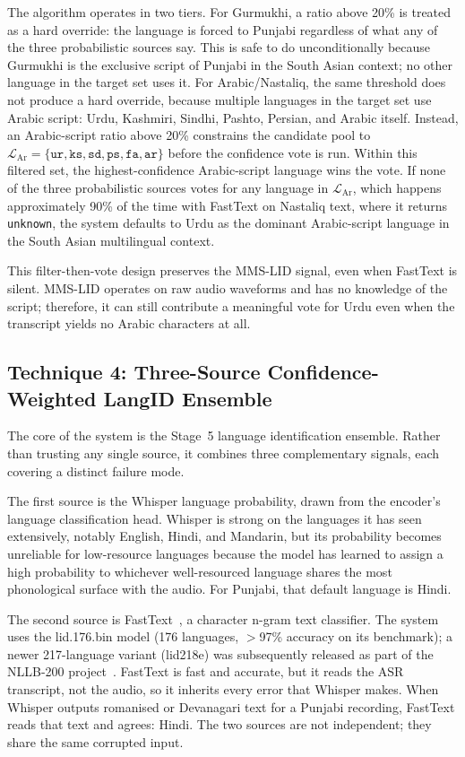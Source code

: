 \documentclass[conference]{IEEEtran}
\begin{document}
The algorithm operates in two tiers. For Gurmukhi, a ratio above 20\% is treated as a hard override: the language is forced to Punjabi regardless of what any of the three probabilistic sources say. This is safe to do unconditionally because Gurmukhi is the exclusive script of Punjabi in the South Asian context; no other language in the target set uses it. For Arabic/Nastaliq, the same threshold does not produce a hard override, because multiple languages in the target set use Arabic script: Urdu, Kashmiri, Sindhi, Pashto, Persian, and Arabic itself. Instead, an Arabic-script ratio above 20\% constrains the candidate pool to $\mathcal{L}_{\text{Ar}} = \{\texttt{ur}, \texttt{ks}, \texttt{sd}, \texttt{ps}, \texttt{fa}, \texttt{ar}\}$ before the confidence vote is run. Within this filtered set, the highest-confidence Arabic-script language wins the vote. If none of the three probabilistic sources votes for any language in $\mathcal{L}_{\text{Ar}}$, which happens approximately 90\% of the time with FastText on Nastaliq text, where it returns \texttt{unknown}, the system defaults to Urdu as the dominant Arabic-script language in the South Asian multilingual context.

This filter-then-vote design preserves the MMS-LID signal, even when FastText is silent. MMS-LID operates on raw audio waveforms and has no knowledge of the script; therefore, it can still contribute a meaningful vote for Urdu even when the transcript yields no Arabic characters at all.

\subsection{Technique 4: Three-Source Confidence-Weighted LangID Ensemble}

The core of the system is the Stage~5 language identification ensemble. Rather than trusting any single source, it combines three complementary signals, each covering a distinct failure mode.

The first source is the Whisper language probability, drawn from the encoder's language classification head. Whisper is strong on the languages it has seen extensively, notably English, Hindi, and Mandarin, but its probability becomes unreliable for low-resource languages because the model has learned to assign a high probability to whichever well-resourced language shares the most phonological surface with the audio. For Punjabi, that default language is Hindi.

The second source is FastText~\cite{joulin2017bag}, a character n-gram text classifier. The system uses the lid.176.bin model (176 languages, $>$97\% accuracy on its benchmark); a newer 217-language variant (lid218e) was subsequently released as part of the NLLB-200 project~\cite{costajussa2024nllb}. FastText is fast and accurate, but it reads the ASR transcript, not the audio, so it inherits every error that Whisper makes. When Whisper outputs romanised or Devanagari text for a Punjabi recording, FastText reads that text and agrees: Hindi. The two sources are not independent; they share the same corrupted input.
\end{document}
